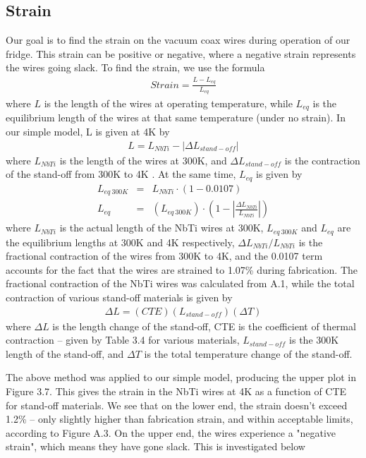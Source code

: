 \documentclass{report}
\begin{document}
\subsection{Strain}
Our goal is to find the strain on the vacuum coax wires during operation of our fridge. This strain can be positive or negative, where a negative strain represents the wires going slack. To find the strain, we use the formula
\begin{eqnarray}
Strain = \frac{L - L_{eq}}{L_{eq}}
\end{eqnarray}
where $L$ is the length of the wires at operating temperature, while $L_{eq}$ is the equilibrium length of the wires at that same temperature (under no strain). In our simple model, L is given at 4K by
\begin{eqnarray}
L = L_{NbTi} - |\Delta L_{stand-off}|
\end{eqnarray}
where $L_{NbTi}$ is the length of the wires at 300K, and $\Delta L_{stand-off}$ is the contraction of the stand-off from 300K to 4K \footnotemark. At the same time, $L_{eq}$ is given by
\begin{eqnarray}
L_{eq \ 300K} & = & L_{NbTi} \cdot (1 - 0.0107) \\
L_{eq} & = & (L_{eq \ 300K})\cdot\left(1 - \left|\frac{\Delta L_{NbTi}}{L_{NbTi}}\right|\right)
\end{eqnarray}
where $L_{NbTi}$ is the actual length of the NbTi wires at 300K, $L_{eq \ 300K}$ and $L_{eq}$ are the equilibrium lengths at 300K and 4K respectively, $\Delta L_{NbTi}/L_{NbTi}$ is the fractional contraction of the wires from 300K to 4K, and the 0.0107 term accounts for the fact that the wires are strained to 1.07\% during fabrication. The fractional contraction of the NbTi wires was calculated from A.1, while the total contraction of various stand-off materials is given by
\begin{eqnarray}
\Delta L = (CTE)(L_{stand-off})(\Delta T)
\end{eqnarray}
where $\Delta L$ is the length change of the stand-off, CTE is the coefficient of thermal contraction -- given by Table 3.4 for various materials, $L_{stand-off}$ is the 300K length of the stand-off, and $\Delta T$ is the total temperature change of the stand-off.


The above method was applied to our simple model, producing the upper plot in Figure 3.7. This gives the strain in the NbTi wires at 4K as a function of CTE for stand-off materials. We see that on the lower end, the strain doesn't exceed 1.2\% -- only slightly higher than fabrication strain, and within acceptable limits, according to Figure A.3. On the upper end, the wires experience a "negative strain", which means they have gone slack. This is investigated below
\end{document}
